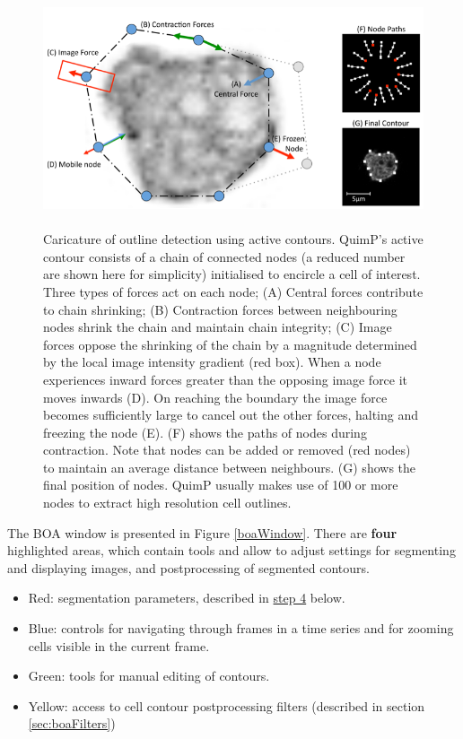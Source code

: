 \documentclass[a4paper,12pt]{article}
\begin{document}
\begin{figure}[ht]
   \centering
   \includegraphics[height=7cm]{activeContour.png} %
   \caption{Caricature of outline detection using active
contours.
QuimP's active contour consists of a chain of connected
nodes (a reduced number are shown here for simplicity) initialised
to encircle a cell of interest. Three types of forces act on each
node; (A) Central forces contribute to chain shrinking; (B) Contraction
forces between neighbouring nodes shrink the chain and maintain chain
integrity; (C) Image forces oppose the shrinking of the chain by a
magnitude determined by the local image intensity gradient (red box).
When a node experiences inward forces greater than the opposing
image force it moves inwards (D). On reaching the boundary the image force becomes
sufficiently large to cancel out the other forces, halting and freezing
the node (E). (F) shows the paths of nodes during contraction. Note
that nodes can be added or removed (red nodes) to maintain an average
distance between neighbours. (G) shows the final position of nodes.
QuimP usually makes use of 100 or more nodes to extract high resolution
cell outlines. \cite{Tyson2010}}
   \label{activeContour}
\end{figure}

The BOA window is presented in Figure \ref{boaWindow}. There are \textbf{four} highlighted areas, which contain tools and allow to adjust settings for segmenting and displaying images, and postprocessing of segmented contours. 
\begin{itemize}
	\item Red:  segmentation parameters, described in \hyperref[step4]{step 4} below. 
	\item Blue: controls for navigating through frames in a time series and for zooming cells visible in the current frame.
	\item Green: tools for manual editing of contours.
	\item Yellow: access to cell contour postprocessing filters (described in section \ref{sec:boaFilters})
\end{itemize}
\end{document}
